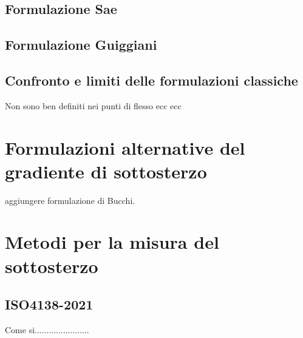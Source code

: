 \subsection{Formulazione Sae}

\subsection{Formulazione Guiggiani}

\subsection{Confronto e limiti delle formulazioni classiche}
Non sono ben definiti nei punti di flesso ecc ecc

\section{Formulazioni alternative del gradiente di sottosterzo}
aggiungere formulazione di Bucchi.



\section{Metodi per la misura del sottosterzo}
\subsection{ISO4138-2021}

Come si.......................
